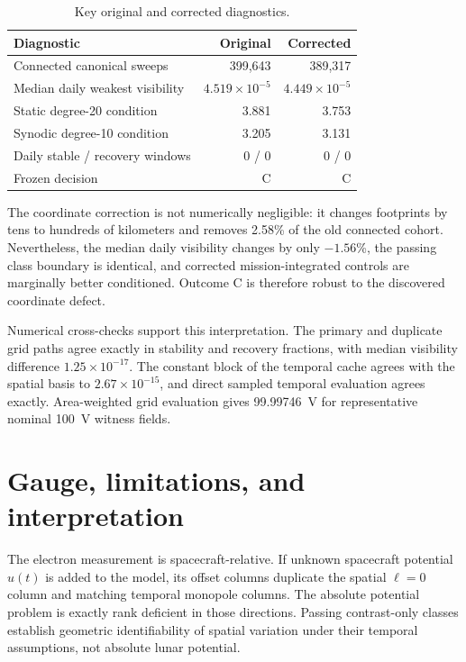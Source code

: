 \documentclass[11pt]{article}
\begin{document}
\begin{table}[ht]
\centering
\caption{Key original and corrected diagnostics.}
\label{tab:comparison}
\begin{tabular}{lrr}
\toprule
Diagnostic & Original & Corrected \\
\midrule
Connected canonical sweeps & 399,643 & 389,317 \\
Median daily weakest visibility & $4.519\times10^{-5}$ & $4.449\times10^{-5}$ \\
Static degree-20 condition & 3.881 & 3.753 \\
Synodic degree-10 condition & 3.205 & 3.131 \\
Daily stable / recovery windows & 0 / 0 & 0 / 0 \\
Frozen decision & C & C \\
\bottomrule
\end{tabular}
\end{table}

The coordinate correction is not numerically negligible: it changes
footprints by tens to hundreds of kilometers and removes 2.58\% of the old
connected cohort.  Nevertheless, the median daily visibility changes by only
$-1.56$\%, the passing class boundary is identical, and corrected
mission-integrated controls are marginally better conditioned.  Outcome C is
therefore robust to the discovered coordinate defect.

Numerical cross-checks support this interpretation.  The primary and duplicate
grid paths agree exactly in stability and recovery fractions, with median
visibility difference $1.25\times10^{-17}$.  The constant block of the temporal
cache agrees with the spatial basis to $2.67\times10^{-15}$, and direct sampled
temporal evaluation agrees exactly.  Area-weighted grid evaluation gives
99.99746~V for representative nominal 100~V witness fields.

\section{Gauge, limitations, and interpretation}

The electron measurement is spacecraft-relative.  If unknown spacecraft
potential $u(t)$ is added to the model, its offset columns duplicate the
spatial $\ell=0$ column and matching temporal monopole columns.  The absolute
potential problem is exactly rank deficient in those directions.  Passing
contrast-only classes establish geometric identifiability of spatial
variation under their temporal assumptions, not absolute lunar potential.
\end{document}
